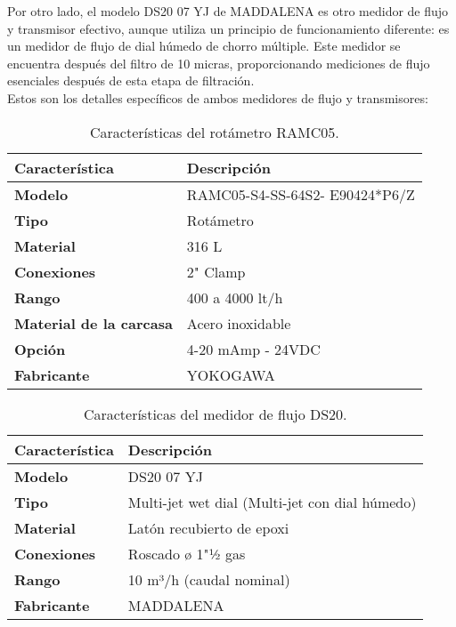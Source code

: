 Por otro lado, el modelo DS20 07 YJ de MADDALENA es otro medidor de flujo y transmisor efectivo, aunque utiliza un principio de funcionamiento diferente: es un medidor de flujo de dial húmedo de chorro múltiple. Este medidor se encuentra después del filtro de 10 micras, proporcionando mediciones de flujo esenciales después de esta etapa de filtración.\\

Estos son los detalles específicos de ambos medidores de flujo y transmisores:\\

\begin{table}[H]
    \centering
    \caption{Características del rotámetro RAMC05.}
    \label{table:sensor_transmisor_flujo}
    \begin{tabular}{| L{5cm} | L{5cm} |}
        \hline
        \textbf{Característica} & \textbf{Descripción}  \\
        \hline
        \textbf{Modelo} & RAMC05-S4-SS-64S2- E90424*P6/Z  \\
        \hline
        \textbf{Tipo} & Rotámetro  \\
        \hline
        \textbf{Material} & 316 L  \\
        \hline
        \textbf{Conexiones} & 2" Clamp  \\
        \hline
        \textbf{Rango} & 400 a 4000 lt/h  \\
        \hline
        \textbf{Material de la carcasa} & Acero inoxidable  \\
        \hline
        \textbf{Opción} & 4-20 mAmp - 24VDC  \\
        \hline
        \textbf{Fabricante} & YOKOGAWA  \\
        \hline
    \end{tabular}
\end{table}


\begin{table}[H]
    \centering
    \caption{Características del medidor de flujo DS20.}
    \label{table:medidor}
    \begin{tabular}{| L{5cm} | L{5cm} |}
        \hline
        \textbf{Característica} & \textbf{Descripción}  \\
        \hline
        \textbf{Modelo} & DS20 07 YJ  \\
        \hline
        \textbf{Tipo} & Multi-jet wet dial (Multi-jet con dial húmedo)  \\
        \hline
        \textbf{Material} & Latón recubierto de epoxi  \\
        \hline
        \textbf{Conexiones} & Roscado ø 1"½ gas  \\
        \hline
        \textbf{Rango} & 10 m³/h (caudal nominal)  \\
        \hline
        \textbf{Fabricante} & MADDALENA  \\
        \hline
    \end{tabular}
\end{table}

